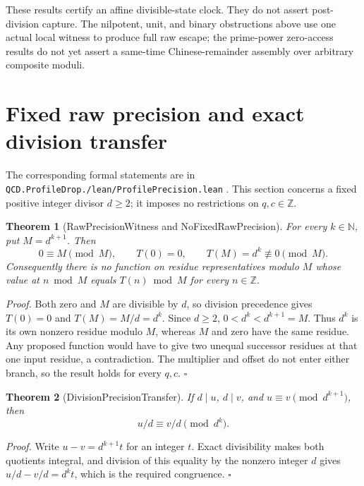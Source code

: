 \documentclass[11pt,letterpaper]{article}
\newcommand{\N}{\mathbb{N}}
\newcommand{\Z}{\mathbb{Z}}
\newtheorem{theorem}{Theorem}
\newenvironment{proof}{\noindent\textit{Proof.}}{\hfill\(\square\)}
\begin{document}
These results certify an affine divisible-state clock. They do not
assert post-division capture. The nilpotent, unit, and binary
obstructions above use one actual local witness to produce full raw
escape; the prime-power zero-access results do not yet assert a
same-time Chinese-remainder assembly over arbitrary composite moduli.

\section{Fixed raw precision and exact division transfer}

The corresponding formal statements are in
\texttt{QCD.\allowbreak Profile\allowbreak Drop./\allowbreak lean/\allowbreak Profile\allowbreak Precision.\allowbreak lean}
\cite{LibraryPrecision26}. This section concerns a fixed positive
integer divisor \(d\ge2\); it imposes no restrictions on \(q,c\in\Z\).

\begin{theorem}[RawPrecisionWitness and NoFixedRawPrecision]
For every \(k\in\N\), put \(M=d^{k+1}\). Then
\[
0\equiv M\pmod M,\qquad
T(0)=0,\qquad T(M)=d^k\not\equiv0\pmod M.
\]
Consequently there is no function on residue representatives modulo \(M\)
whose value at \(n\bmod M\) equals \(T(n)\bmod M\) for every \(n\in\Z\).
\end{theorem}
\begin{proof}
Both zero and \(M\) are divisible by \(d\), so division precedence gives
\(T(0)=0\) and \(T(M)=M/d=d^k\). Since \(d\ge2\),
\(0<d^k<d^{k+1}=M\). Thus \(d^k\) is its own nonzero residue modulo
\(M\), whereas \(M\) and zero have the same residue. Any proposed
function would have to give two unequal successor residues at that one
input residue, a contradiction. The multiplier and offset do not enter
either branch, so the result holds for every \(q,c\).
\end{proof}

\begin{theorem}[DivisionPrecisionTransfer]
If \(d\mid u\), \(d\mid v\), and
\(u\equiv v\pmod{d^{k+1}}\), then
\[
 u/d\equiv v/d\pmod{d^k}.
\]
\end{theorem}
\begin{proof}
Write \(u-v=d^{k+1}t\) for an integer \(t\). Exact divisibility makes
both quotients integral, and division of this equality by the nonzero
integer \(d\) gives \(u/d-v/d=d^kt\), which is the required congruence.
\end{proof}
\end{document}
